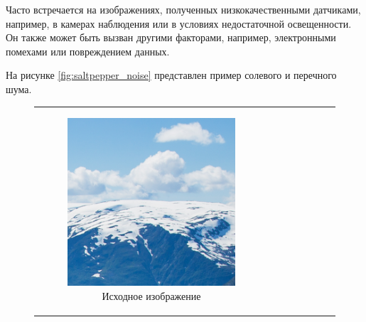 Часто встречается на изображениях, полученных низкокачественными датчиками, например, в камерах наблюдения или в условиях недостаточной освещенности. Он также может быть вызван другими факторами, например, электронными помехами или повреждением данных.

На рисунке \ref{fig:saltpepper_noise} представлен пример солевого и перечного шума.

\begin{figure}[h!]
  \centering
  \begin{tabular}{cc}
    \begin{subfigure}{0.45\textwidth}
      \includegraphics[width=\linewidth]{inc/analysis/noises/original.png}
      \caption{Исходное изображение}
    \end{subfigure} &
    \begin{subfigure}{0.45\textwidth}

\end{subfigure}
\end{tabular}
\end{figure}

